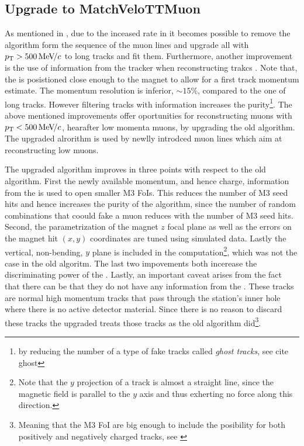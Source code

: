 
\subsection{Upgrade to MatchVeloTTMuon}
\label{sec:matchvelottmuon}
As mentioned in , due to the inceased \hltone rate in \runtwo it becomes possible to
remove the \mvm algorithm form the sequence of the \hltone muon lines and upgrade all \veloTracks with $\mbox{$p_{\rm T}$}>500 {\mathrm{\,Me\kern -0.1em V\!/}c}$ to long tracks and fit them.
Furthermore, another improvement is the use of information from the \ttracker tracker when reconstructing \velo trakcs \cite{LHCb-PUB-2015-005}.
Note that, the \ttracker is posistioned close enough to the \lhcb magnet to allow for a first track momentum estimate.
The \ttracker momentum resolution is inferior, $\sim 15\%$, compared to the one of long tracks. However filtering
\velo tracks with \ttracker information increases the purity\footnote{by reducing the number of a type of fake tracks called {\it ghost tracks}, see {\color{red} cite ghost}}.
The above mentioned improvements offer oportunities for reconstructing muons with $\mbox{$p_{\rm T}$}<500 {\mathrm{\,Me\kern -0.1em V\!/}c}$, hearafter low momenta muons,
by upgrading the old \mvm algorithm. The upgraded alrorithm is used by newlly introdced \hltone muon lines which aim
at reconstructing low \pt muons.

The upgraded \mvTTm algorithm improves in three points with respect to the old \mvm algorithm.
First the newly available momentum, and hence charge, information from the \ttracker is used to open smaller M3 FoIs.
This reduces the number of M3 seed hits and hence increases the purity of the \mvTTm algorithm, since the number of
random combinations that coould fake a muon reduces with the number of M3 seed hits.
Second, the parametrization of the magnet $z$ focal plane as well as the errors on the magnet hit $(x,y)$ coordinates
are tuned using simulated data. Lastly the vertical, non-bending, $y$ plane is included in the \chisq
computation\footnote{Note that the $y$ projection of a track is almost a straight line, since the magnetic field is parallel to the $y$ axis
and thus exherting no force along this direction.}, which was not the case in the old \mvm algoritm.
The last two impovements both incerease the discriminating power of the \chisq.
Lastly, an important caveat arises from the fact that there can be \veloTTracks that they do not have any information from
the \ttracker. These tracks are normal high momentum tracks that pass through the \ttracker station's inner hole
where there is no active detector material. Since there is no reason to discard these tracks the upgraded \mvTTm treats
those tracks as the old \mvm algorithm did\footnote{Meaning that the M3 FoI are big enough to include the posibility for
both positively and negatively charged tracks, see \cite{roelThesis}}.

